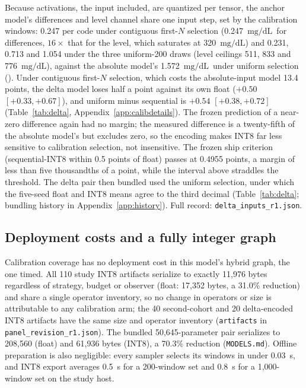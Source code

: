 \documentclass[10pt,twocolumn]{article}
\newcommand{\mgdl}{\ensuremath{\mathrm{mg/dL}}}
\begin{document}
Because activations, the input included, are quantized per tensor, the
anchor model's differences and level channel share one input step, set by
the calibration windows: 0.247 per code under contiguous first-$N$
selection (0.247~\mgdl\ for differences, $16\times$ that for the level,
which saturates at 320~\mgdl) and 0.231, 0.713 and 1.054 under the three
uniform-200 draws (level ceilings 511, 833 and 776~\mgdl), against the
absolute model's 1.572~\mgdl\ under uniform selection
(). Under contiguous first-$N$
selection, which costs the absolute-input model 13.4 points, the delta
model loses half a point against its own float ($+0.50$
$[+0.33, +0.67]$), and uniform minus sequential is $+0.54$
$[+0.38, +0.72]$ (Table~\ref{tab:delta}, Appendix~\ref{app:calibdetails}).
The frozen prediction of a
near-zero difference again had no margin; the measured difference is a
twenty-fifth of the absolute model's but excludes zero, so the encoding
makes INT8 far less sensitive to calibration selection, not insensitive.
The frozen ship criterion (sequential-INT8 within 0.5 points of float)
passes at 0.4955 points, a margin of less than five thousandths of a
point, while the interval above straddles the threshold. The delta pair
then bundled used the uniform selection, under which the five-seed float
and INT8 means agree to the third decimal (Table~\ref{tab:delta}; bundling
history in Appendix~\ref{app:history}).
Full record: \texttt{delta\_inputs\_r1.json}.

\subsection{Deployment costs and a fully integer graph}
\label{sec:deploycost}

Calibration coverage has no deployment cost in this model's hybrid
graph, the one timed. All 110 study
INT8 artifacts serialize to exactly 11,976 bytes regardless of strategy,
budget or observer (float: 17,352 bytes, a 31.0\% reduction) and share a
single operator inventory, so no change in operators or size is
attributable to any calibration arm; the 40 second-cohort and 20
delta-encoded INT8 artifacts have the same size and operator inventory
(\texttt{artifacts} in \texttt{panel\_revision\_r1.json}). The bundled
50,645-parameter pair serializes to 208,560 (float) and 61,936 bytes
(INT8), a 70.3\% reduction (\texttt{MODELS.md}). Offline
preparation is also negligible: every sampler selects its windows in under
0.03~s, and INT8 export averages 0.5~s for a 200-window set and 0.8~s for
a 1,000-window set on the study host.
\end{document}

